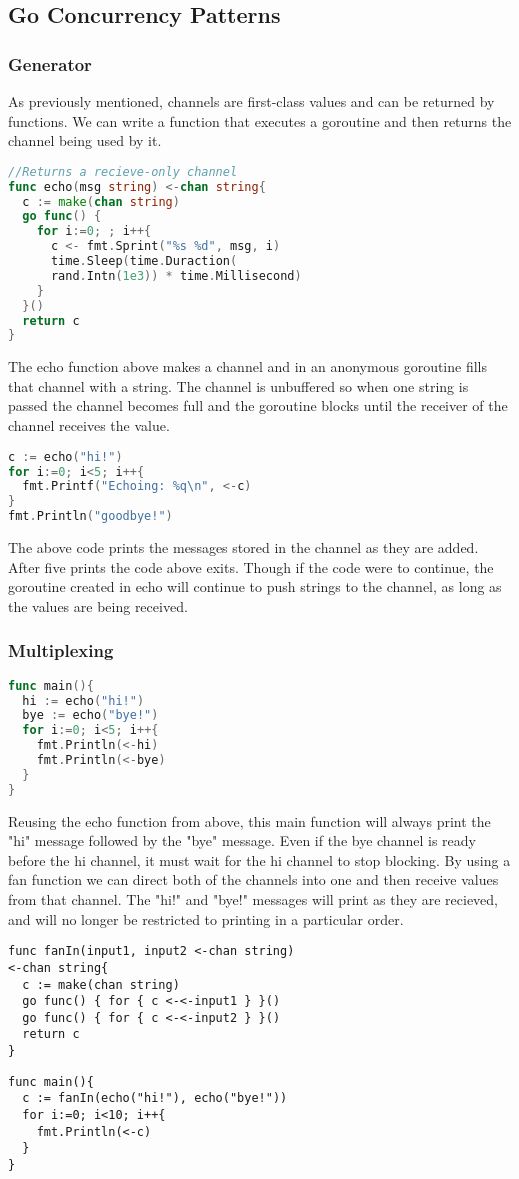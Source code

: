 \subsection{Go Concurrency Patterns}
\subsubsection{Generator}
As previously mentioned, channels are first-class values and can be returned by functions. We can write a function that executes a goroutine and then returns the channel being used by it.
\begin{lstlisting}[language=Go]
//Returns a recieve-only channel
func echo(msg string) <-chan string{
  c := make(chan string)
  go func() {
    for i:=0; ; i++{
      c <- fmt.Sprint("%s %d", msg, i)
      time.Sleep(time.Duraction(
      rand.Intn(1e3)) * time.Millisecond)
    }
  }()
  return c
}
\end{lstlisting}
The echo function above makes a channel and in an anonymous goroutine fills that channel with a string. The channel is unbuffered so when one string is passed the channel becomes full and the goroutine blocks until the receiver of the channel receives the value.
\begin{lstlisting}[language=Go]
c := echo("hi!")
for i:=0; i<5; i++{
  fmt.Printf("Echoing: %q\n", <-c)
}
fmt.Println("goodbye!")
\end{lstlisting}
The above code prints the messages stored in the channel as they are added. After five prints the code above exits. Though if the code were to continue, the goroutine created in echo will continue to push strings to the channel, as long as the values are being received. \cite{video:go-concurr-patterns}
\subsubsection{Multiplexing}
\begin{lstlisting}[language=Go]
func main(){
  hi := echo("hi!")
  bye := echo("bye!")
  for i:=0; i<5; i++{
    fmt.Println(<-hi)
    fmt.Println(<-bye)
  }
}
\end{lstlisting}
Reusing the echo function from above, this main function will always print the "hi" message followed by the "bye" message. Even if the bye channel is ready before the hi channel, it must wait for the hi channel to stop blocking. By using a fan function we can direct both of the channels into one and then receive values from that channel. The "hi!" and "bye!" messages will print as they are recieved, and will no longer be restricted to printing in a particular order. \cite{video:go-concurr-patterns}
\begin{lstlisting}
func fanIn(input1, input2 <-chan string)
<-chan string{
  c := make(chan string)
  go func() { for { c <-<-input1 } }()
  go func() { for { c <-<-input2 } }()
  return c
}
\end{lstlisting}
\begin{lstlisting}
func main(){
  c := fanIn(echo("hi!"), echo("bye!"))
  for i:=0; i<10; i++{
    fmt.Println(<-c)
  }
}

\end{lstlisting}
